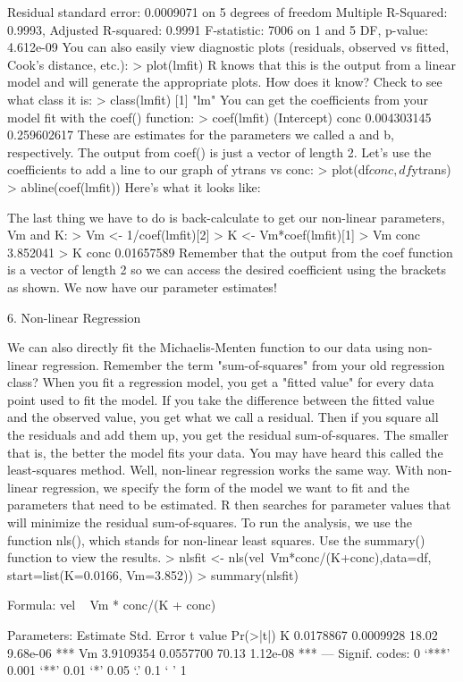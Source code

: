 Residual standard error: 0.0009071 on 5 degrees of freedom
Multiple R-Squared: 0.9993,     Adjusted R-squared: 0.9991 
F-statistic:  7006 on 1 and 5 DF,  p-value: 4.612e-09 
You can also easily view diagnostic plots (residuals, observed vs fitted, Cook's distance, etc.): 
> plot(lmfit)
R knows that this is the output from a linear model and will generate the appropriate plots. How does it know? Check to see what class it is: 
> class(lmfit)
[1] "lm"
You can get the coefficients from your model fit with the coef() function: 
> coef(lmfit)
(Intercept)        conc 
0.004303145 0.259602617
These are estimates for the parameters we called a and b, respectively. The output from coef() is just a vector of length 2. Let's use the coefficients to add a line to our graph of ytrans vs conc: 
> plot(df$conc, df$ytrans)
> abline(coef(lmfit))
Here's what it looks like:

The last thing we have to do is back-calculate to get our non-linear parameters, Vm and K: 
> Vm <- 1/coef(lmfit)[2]
> K <- Vm*coef(lmfit)[1]
> Vm
    conc 
3.852041 
> K
      conc 
0.01657589 
Remember that the output from the coef function is a vector of length 2 so we can access the desired coefficient using the brackets as shown. We now have our parameter estimates! 

6. Non-linear Regression


We can also directly fit the Michaelis-Menten function to our data using non-linear regression. Remember the term "sum-of-squares" from your old regression class? When you fit a regression model, you get a "fitted value" for every data point used to fit the model. If you take the difference between the fitted value and the observed value, you get what we call a residual. Then if you square all the residuals and add them up, you get the residual sum-of-squares. The smaller that is, the better the model fits your data. You may have heard this called the least-squares method. Well, non-linear regression works the same way. With non-linear regression, we specify the form of the model we want to fit and the parameters that need to be estimated. R then searches for parameter values that will minimize the residual sum-of-squares. 
To run the analysis, we use the function nls(), which stands for non-linear least squares. Use the summary() function to view the results. 
> nlsfit <- nls(vel~Vm*conc/(K+conc),data=df, start=list(K=0.0166, Vm=3.852))
> summary(nlsfit)

Formula: vel ~ Vm * conc/(K + conc)

Parameters:
    Estimate Std. Error t value Pr(>|t|)    
K  0.0178867  0.0009928   18.02 9.68e-06 ***
Vm 3.9109354  0.0557700   70.13 1.12e-08 ***
---
Signif. codes:  0 `***' 0.001 `**' 0.01 `*' 0.05 `.' 0.1 ` ' 1 

